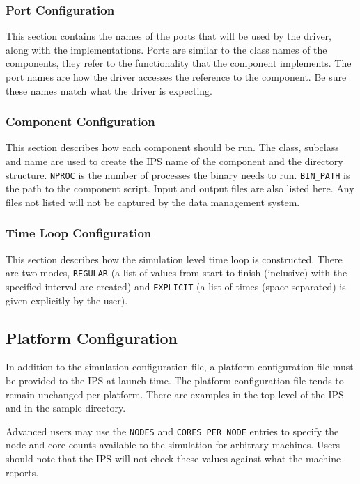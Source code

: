 \subsubsection{Port Configuration}
\par 
This section contains the names of the ports that will be used by the 
driver, along with the implementations.  Ports are similar to the class 
names of the components, they refer to the functionality that the component 
implements.  The port names are how the driver accesses the reference to 
the component.  Be sure these names match what the driver is expecting.

\subsubsection{Component Configuration}
\par 
This section describes how each component should be run.  The class, 
subclass and name are used to create the IPS name of the component and the 
directory structure.  \texttt{NPROC} is the number of processes the binary needs to 
run.  \texttt{BIN\_PATH} is the path to the component script.  Input and output files  
are also listed here.  Any files not listed will not be captured by the 
data management system.

\subsubsection{Time Loop Configuration}
\par 
This section describes how the simulation level time loop is 
constructed.  There are two modes, \texttt{REGULAR} (a list of values from start to 
finish (inclusive) with the specified interval are created) and \texttt{EXPLICIT} (a 
list of times (space separated) is given explicitly by the user).


\subsection{Platform Configuration}
\label{sec:plat_config}
\par
In addition to the simulation configuration file, a platform configuration 
file must be provided to the {IPS} at launch time.  The platform 
configuration file tends to remain unchanged per platform.  There are 
examples in the top level of the {IPS} and in the sample directory.
\par
Advanced users may use the \texttt{NODES} and \texttt{CORES\_PER\_NODE} entries to specify the node and core counts available to the simulation for arbitrary machines.  Users should note that the IPS will not check these values against what the machine reports.



